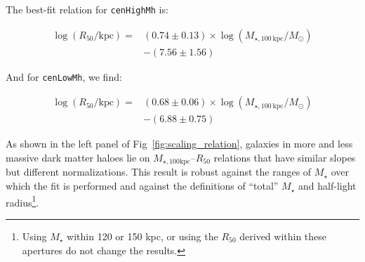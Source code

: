 \documentclass[a4paper,fleqn,usenatbib]{mnras}
\def\rbcg{\texttt{cenHighMh}}
\def\nbcg{\texttt{cenLowMh}}
\def\mstar{{$M_{\star}$}}
\def\mtot{{$M_{\star,100\mathrm{kpc}}$}}
\begin{document}
    The best-fit relation for \rbcg{} is:
    
    \begin{equation}
        \begin{aligned}
        \log (R_{\mathrm{50}}/\mathrm{kpc}) = & (0.74\pm0.13) \times \log (M_{\star, 100\ \mathrm{kpc}}/M_{\odot}) \\ & -(7.56\pm1.56)
        \end{aligned}
    \end{equation}

    \noindent And for \nbcg{}, we find:
    
    \begin{equation}
        \begin{aligned}
        \log (R_{\mathrm{50}}/\mathrm{kpc}) = & (0.68\pm0.06) \times \log (M_{\star, 100\ \mathrm{kpc}}/M_{\odot}) \\ & -(6.88\pm0.75)
        \end{aligned}
    \end{equation}
    
    \noindent As shown in the left panel of Fig~\ref{fig:scaling_relation}, galaxies 
    in more and less massive dark matter haloes lie on \mtot{}--$R_{\mathrm{50}}$ 
    relations that have similar slopes but different normalizations. 
    This result is robust against the ranges of \mstar{} over which the fit is performed 
    and against the definitions of  ``total'' \mstar{} and half-light 
    radius\footnote{Using \mstar{} within 120 or 150 kpc, or using the 
    $R_{\mathrm{50}}$ derived within these apertures do not change the results.}.
    
\end{document}
